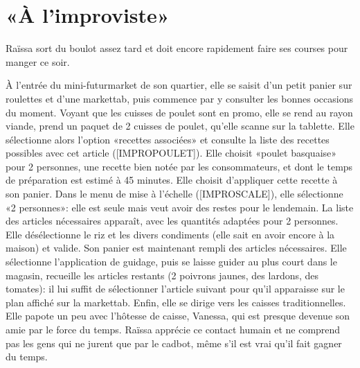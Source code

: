 \section{«À l'improviste»}

Raïssa sort du boulot assez tard et doit encore rapidement faire ses courses pour manger ce soir.
\par
À l'entrée du mini-futurmarket de son quartier, elle se saisit d'un petit panier sur roulettes et d'une markettab, puis commence par y consulter les bonnes occasions du moment.
Voyant que les cuisses de poulet sont en promo, elle se rend au rayon viande, prend un paquet de 2 cuisses de poulet, qu'elle scanne sur la tablette.
Elle sélectionne alors l'option «recettes associées» et consulte la liste des recettes possibles avec cet article ([IMPROPOULET]).
Elle choisit «poulet basquaise» pour 2 personnes, une recette bien notée par les consommateurs, et dont le temps de préparation est estimé à 45 minutes.
Elle choisit d'appliquer cette recette à son panier. 
Dans le menu de mise à l'échelle ([IMPROSCALE]), elle sélectionne «2 personnes»: elle est seule mais veut avoir des restes pour le lendemain.
La liste des articles nécessaires apparaît, avec les quantités adaptées pour 2 personnes.
Elle désélectionne le riz et les divers condiments (elle sait en avoir encore à la maison) et valide.
Son panier est maintenant rempli des articles nécessaires.
Elle sélectionne l'application de guidage, puis se laisse guider au plus court dans le magasin, recueille les articles restants (2 poivrons jaunes, des lardons, des tomates): il lui suffit de sélectionner l'article suivant pour qu'il apparaisse sur le plan affiché sur la markettab.
Enfin, elle se dirige vers les caisses traditionnelles.
Elle papote un peu avec l'hôtesse de caisse, Vanessa, qui est presque devenue son amie par le force du temps. 
Raïssa apprécie ce contact humain et ne comprend pas les gens qui ne jurent que par le cadbot, même s'il est vrai qu'il fait gagner du temps.
